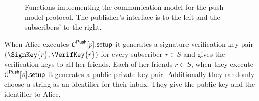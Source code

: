 \begin{figure}%
  \caption{%
    Functions implementing the communication model for the push model protocol.
    The publisher's interface is to the left and the subscribers' to the right.
  }\label{PushFunctions}
\end{figure}

When Alice executes \(\pnsetup{p}\) it generates a signature-verification 
key-pair \((\SignKey{r}, \VerifKey{r})\) for every subscriber \(r\in S\) and 
gives the verification keys to all her friends.
Each of her friends \(r\in S\), when they execute \(\pnsetup{s}\) it generates 
a public-private key-pair.
Additionally they randomly choose a string as an identifier for their inbox.
They give the public key and the identifier to Alice.

